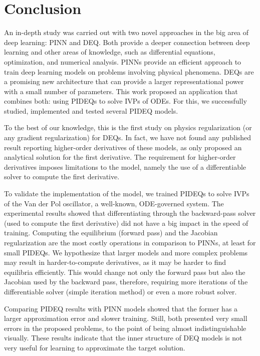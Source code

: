 \chapter{Conclusion}\label{ch:conclusion}

An in-depth study was carried out with two novel approaches in the big area of deep learning: \gls{PINN} and {DEQ}.
Both provide a deeper connection between deep learning and other areas of knowledge, such as differential equations, optimization, and numerical analysis.
\gls{PINN}s provide an efficient approach to train deep learning models on problems involving physical phenomena.
\gls{DEQ}s are a promising new architecture that can provide a larger representational power with a small number of parameters.
This work proposed an application that combines both: using \gls{PIDEQ}s to solve \gls{IVP}s of \gls{ODE}s.
For this, we successfully studied, implemented and tested several \gls{PIDEQ} models.

To the best of our knowledge, this is the first study on physics regularization (or any gradient regularization) for \gls{DEQ}s.
In fact, we have not found any published result reporting higher-order derivatives of these models, as \textcite{Bai2019} only proposed an analytical solution for the first derivative.
The requirement for higher-order derivatives imposes limitations to the model, namely the use of a differentiable solver to compute the first derivative.

To validate the implementation of the model, we trained \gls{PIDEQ}s to solve \gls{IVP}s of the Van der Pol oscillator, a well-known, \gls{ODE}-governed system.
The experimental results showed that differentiating through the backward-pass solver (used to compute the first derivative) did not have a big impact in the speed of training.
Computing the equilibrium (forward pass) and the Jacobian regularization are the most costly operations in comparison to \gls{PINN}s, at least for small \glspl{PIDEQ}.
We hypothesize that larger models and more complex problems may result in harder-to-compute derivatives, as it may be harder to find equilibria efficiently.
This would change not only the forward pass but also the Jacobian used by the backward pass, therefore, requiring more iterations of the differentiable solver (simple iteration method) or even a more robust solver.

Comparing \gls{PIDEQ} results with \gls{PINN} models showed that the former has a larger approximation error and slower training.
Still, both presented very small errors in the proposed problems, to the point of being almost indistinguishable visually.
These results indicate that the inner structure of \gls{DEQ} models is not very useful for learning to approximate the target solution.


